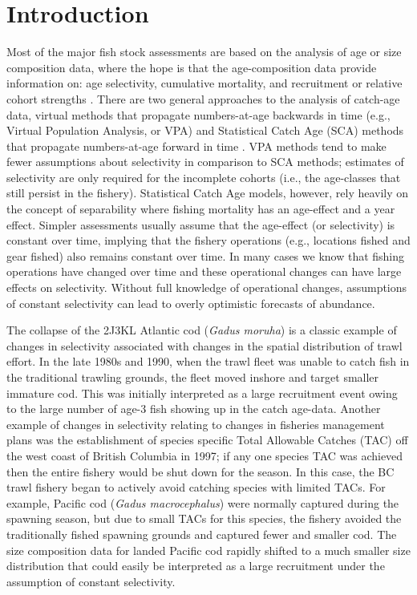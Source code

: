 \section*{Introduction}
Most of the major fish stock assessments are based on the analysis of age or size composition data, where the hope is that the age-composition data provide information on: age selectivity, cumulative mortality, and recruitment or relative cohort strengths \citep{WalMart2004}.  There are two general approaches to the analysis of catch-age data, virtual methods that propagate numbers-at-age backwards in time (e.g., Virtual Population Analysis, or VPA) and Statistical Catch Age (SCA) methods that propagate numbers-at-age forward in time \citep{gavaris2002sif}.  VPA methods tend to make fewer assumptions about selectivity in comparison to SCA methods; estimates of selectivity are only required for the incomplete cohorts (i.e., the age-classes that still persist in the fishery).  Statistical Catch Age models, however, rely heavily on the concept of separability where fishing mortality has an age-effect and a year effect.  Simpler assessments usually assume that the age-effect (or selectivity) is constant over time, implying that the fishery operations (e.g., locations fished and gear fished) also remains constant over time.  In many cases we know that fishing operations have changed over time and these operational changes can have large effects on selectivity.  Without full knowledge of operational changes, assumptions of constant selectivity can lead to overly optimistic forecasts of abundance.

The collapse of the 2J3KL Atlantic cod (\textit{Gadus moruha}) is a classic example of changes in selectivity associated with changes in the spatial distribution of trawl effort.  In the late 1980s and 1990, when the trawl fleet was unable to catch fish in the traditional trawling grounds, the fleet moved inshore and target smaller immature cod.  This was initially interpreted as a large recruitment event owing to the large number of age-3 fish showing up in the catch age-data.  Another example of changes in selectivity relating to changes in fisheries management plans was the establishment of species specific Total Allowable Catches (TAC) off the west coast of British Columbia in 1997; if any one species TAC was achieved then the entire fishery would be shut down for the season.  In this case, the BC trawl fishery began to actively avoid catching species with limited TACs.  For example, Pacific cod (\textit{Gadus macrocephalus}) were normally captured during the spawning season, but due to small TACs for this species, the fishery avoided the traditionally fished spawning grounds and captured fewer and smaller cod.  The size composition data for landed Pacific cod rapidly shifted to a much smaller size distribution that could easily be interpreted as a large recruitment under the assumption of constant selectivity.

